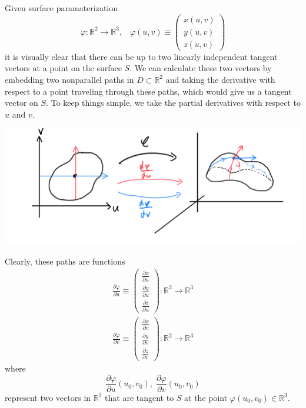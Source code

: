   \begin{definition}
  Given surface paramaterization 
  \[\varphi: \mathbb{R}^2 \longrightarrow \mathbb{R}^3, \;\;\; \varphi(u, v) \equiv \begin{pmatrix}
  x (u, v) \\ y(u, v) \\ z(u, v) 
  \end{pmatrix}\]
  it is visually clear that there can be up to two linearly independent tangent vectors at a point on the surface $S$. We can calculate these two vectors by embedding two nonparallel paths in $D \subset \mathbb{R}^2$ and taking the derivative with respect to a point traveling through these paths, which would give us a tangent vector on $S$. To keep things simple, we take the partial derivatives with respect to $u$ and $v$. 
  \begin{center}
      \includegraphics[scale=0.28]{img/Partial_Derivatives_with_respect_to_U_V.PNG}
  \end{center}
  Clearly, these paths are functions 
  \begin{align*}
      \frac{\partial \varphi}{\partial u} \equiv \begin{pmatrix}
       \frac{\partial x}{\partial u} \\ \frac{\partial y}{\partial u} \\ \frac{\partial z}{\partial u}
      \end{pmatrix} : \mathbb{R}^2 \longrightarrow \mathbb{R}^3\\
      \frac{\partial \varphi}{\partial v} \equiv \begin{pmatrix}
       \frac{\partial x}{\partial v} \\ \frac{\partial y}{\partial v} \\ \frac{\partial z}{\partial v}
      \end{pmatrix} : \mathbb{R}^2 \longrightarrow \mathbb{R}^3
  \end{align*}
  where 
  \[\frac{\partial \varphi}{\partial u} (u_0 ,v_0), \; \frac{\partial \varphi}{\partial v} (u_0, v_0)\]
  represent two vectors in $\mathbb{R}^3$ that are tangent to $S$ at the point $\varphi(u_0, v_0) \in \mathbb{R}^3$. 
  \end{definition}

